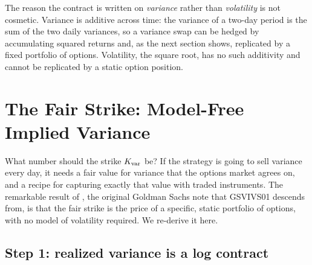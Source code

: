The reason the contract is written on \emph{variance} rather than \emph{volatility} is not cosmetic. Variance is additive across time: the variance of a two-day period is the sum of the two daily variances, so a variance swap can be hedged by accumulating squared returns and, as the next section shows, replicated by a fixed portfolio of options. Volatility, the square root, has no such additivity and cannot be replicated by a static option position.

\section{The Fair Strike: Model-Free Implied Variance}
\label{sec:gsvivs:fair-strike}

What number should the strike $K_{\mathrm{var}}$ be? If the strategy is going to sell variance every day, it needs a fair value for variance that the options market agrees on, and a recipe for capturing exactly that value with traded instruments. The remarkable result of \citet{Demeterfi1999}, the original Goldman Sachs note that GSVIVS01 descends from, is that the fair strike is the price of a specific, static portfolio of options, with no model of volatility required. We re-derive it here.

\subsection*{Step 1: realized variance is a log contract}

